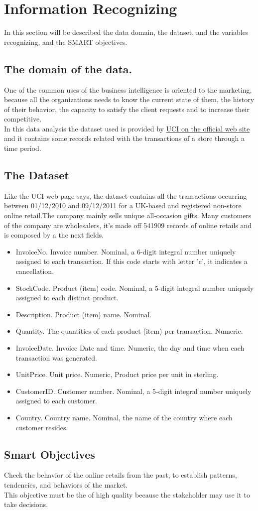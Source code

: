 \section{Information Recognizing}
In this section will be described the data domain, the dataset, and the variables recognizing, and the SMART objectives.

 \subsection{The domain of the data.}
 One of the common uses of the business intelligence is oriented to the marketing, because all the organizations needs to know the current state of them, the history of their behavior, the capacity to satisfy the client requests and to increase their competitive.\\
 In this data analysis the dataset used is provided by  \href{http://archive.ics.uci.edu/ml/datasets/Online+Retail}{UCI on the official web site} and it contains some records related with the transactions of a store through a time period.
 \subsection{The Dataset}
  Like the UCI web page says, the dataset contains all the transactions occurring between 01/12/2010 and 09/12/2011 for a UK-based and registered non-store online retail.The company mainly sells unique all-occasion gifts. Many customers of the company are wholesalers, it's made off 541909 records of online retails and is composed by a the next fields.
 \begin{itemize}
  \item{InvoiceNo.} Invoice number. Nominal, a 6-digit integral number uniquely assigned to each transaction. If this code starts with letter 'c', it indicates a cancellation. 
  \item{StockCode.} Product (item) code. Nominal, a 5-digit integral number uniquely assigned to each distinct product. 
  \item{Description.} Product (item) name. Nominal. 
  \item{Quantity.} The quantities of each product (item) per transaction. Numeric.	
  \item{InvoiceDate.} Invoice Date and time. Numeric, the day and time when each transaction was generated. 
  \item{UnitPrice.} Unit price. Numeric, Product price per unit in sterling. 
  \item{CustomerID.} Customer number. Nominal, a 5-digit integral number uniquely assigned to each customer. 
  \item{Country.} Country name. Nominal, the name of the country where each customer resides.
 \end{itemize}
 \subsection{Smart Objectives}
 Check the behavior of the online retails from the past, to establish patterns, tendencies, and behaviors of the market.\\
 This objective must be the of high quality because the stakeholder may use it to take decisions.
